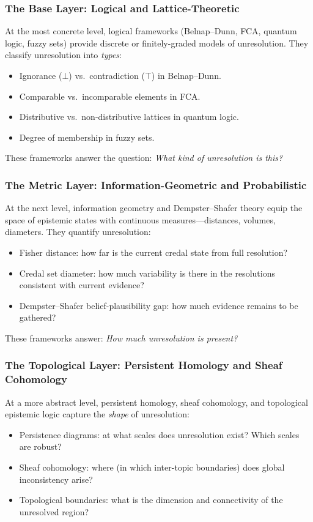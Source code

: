 \documentclass[11pt,letterpaper]{article}
\theoremstyle{definition}
\theoremstyle{remark}
\begin{document}
\subsubsection*{The Base Layer: Logical and Lattice-Theoretic}

At the most concrete level, logical frameworks (Belnap--Dunn, FCA, quantum logic, fuzzy sets) provide discrete or finitely-graded models of unresolution. They classify unresolution into \emph{types}:
\begin{itemize}
\item Ignorance ($\bot$) vs.\ contradiction ($\top$) in Belnap--Dunn.
\item Comparable vs.\ incomparable elements in FCA.
\item Distributive vs.\ non-distributive lattices in quantum logic.
\item Degree of membership in fuzzy sets.
\end{itemize}

These frameworks answer the question: \emph{What kind of unresolution is this?}

\subsubsection*{The Metric Layer: Information-Geometric and Probabilistic}

At the next level, information geometry and Dempster--Shafer theory equip the space of epistemic states with continuous measures---distances, volumes, diameters. They quantify unresolution:
\begin{itemize}
\item Fisher distance: how far is the current credal state from full resolution?
\item Credal set diameter: how much variability is there in the resolutions consistent with current evidence?
\item Dempster--Shafer belief-plausibility gap: how much evidence remains to be gathered?
\end{itemize}

These frameworks answer: \emph{How much unresolution is present?}

\subsubsection*{The Topological Layer: Persistent Homology and Sheaf Cohomology}

At a more abstract level, persistent homology, sheaf cohomology, and topological epistemic logic capture the \emph{shape} of unresolution:
\begin{itemize}
\item Persistence diagrams: at what scales does unresolution exist? Which scales are robust?
\item Sheaf cohomology: where (in which inter-topic boundaries) does global inconsistency arise?
\item Topological boundaries: what is the dimension and connectivity of the unresolved region?
\end{itemize}
\end{document}
